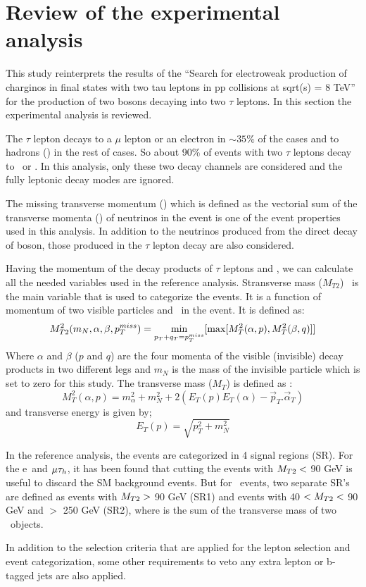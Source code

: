 \section{Review of the experimental analysis}
This study reinterprets the results of the ``Search for electroweak production of charginos in final states with two tau leptons in pp collisions at sqrt(s) = 8 TeV''\cite{Khachatryan:2016trj} for the production of two \wprime bosons decaying into two $\tau$ leptons. In this section the experimental analysis is reviewed.

The $\tau$ lepton decays  to a $\mu$ lepton or an electron in $\sim 35\%$ of the cases and to hadrons (\Tau) in the rest of cases. So about 90\% of events with two $\tau$ leptons decay to \lepTau ~or \tauTau. In this analysis, only these two decay channels are considered and the fully leptonic decay modes are ignored. 

The missing transverse momentum (\MET) which is  defined as the vectorial sum of the transverse momenta (\pt) of neutrinos in the event is one of the event properties used in this analysis. In addition to the neutrinos  produced from the direct decay of \wprime boson, those produced in the $\tau$ lepton decay are also considered.

Having the momentum of the decay products of $\tau$ leptons and \MET, we can calculate all the needed variables used in the reference analysis. Stransverse mass ($M_{T2}$)~\cite{Lester:1999tx,Barr:2003rg}  is the main variable that is used to categorize the events. It is a function of momentum of two visible particles and \MET ~in the event. It is defined as:
\begin{equation}
M^2_{T2}(m_{N},\alpha,\beta,p_T^{miss}) = \displaystyle\min_{p_T+q_T=p_T^{miss}} [\max[M^2_{T}(\alpha,p),M^2_{T}(\beta,q)]]
\end{equation}
Where $\alpha$ and $\beta$ ($p$ and $q$) are the four momenta of the visible (invisible) decay products in two different legs and  $m_N$ is the mass of the invisible particle which is set to zero for this study. The transverse mass ($M_{T}$) is defined as :
\begin{equation}
M^2_{T}(\alpha,p) =  m^2_{\alpha}+m^2_N+2(E_T(p)E_T(\alpha)-\vec{p}_T.\vec{\alpha}_T)
\end{equation}
and transverse energy is given by; 
\begin{equation}
E_T(p)=\sqrt{p^2_T+m^2_N}
\end{equation}

In the reference analysis, the events are categorized in 4 signal regions (SR). For the e\Tau ~and $\mu\tau_h$, it has been found that cutting the events with $M_{T2} <$ 90 GeV is useful to discard the SM background events. But for \tauTau ~events, two separate SR's are defined as events with $M_{T2}>$ 90 GeV (SR1) and events with 40 $<M_{T2}<$ 90 GeV  and \SumMT $>$ 250 GeV (SR2), where \SumMT is the sum of the transverse mass of two \Tau ~objects.

In addition to the selection criteria that are applied for the lepton selection and event categorization, some other requirements to veto any extra lepton or b-tagged jets  are also applied. 

